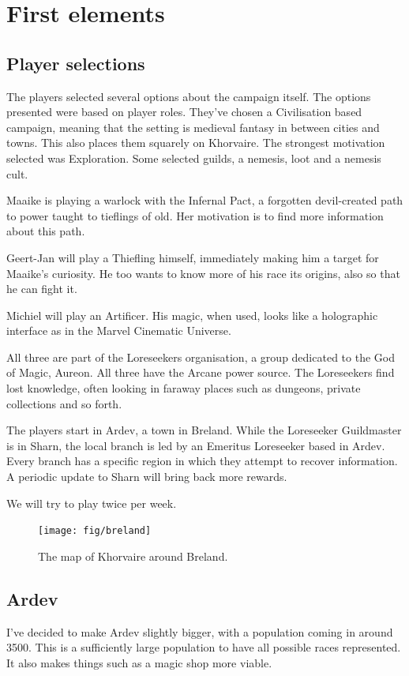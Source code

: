 
\chapter{First elements}
\section{Player selections}
The players selected several options about the campaign itself. The options
presented were based on player roles. They've chosen a Civilisation based campaign, meaning that the setting is medieval fantasy in between cities and towns. This also places them squarely on Khorvaire. The strongest motivation selected was Exploration. Some selected guilds, a nemesis, loot and a nemesis cult. 

Maaike is playing a warlock with the Infernal Pact, a forgotten devil-created path to power taught to tieflings of old. Her motivation is to find more information about this
path.

Geert-Jan will play a Thiefling himself, immediately making him a target for Maaike's curiosity. He too wants to know more of his race its origins, also so that he can fight it.

Michiel will play an Artificer. His magic, when used, looks like a holographic interface as in the Marvel Cinematic Universe. 

All three are part of the Loreseekers organisation, a group dedicated to the God of Magic, Aureon. All three have the Arcane power source. The Loreseekers find lost knowledge, often looking in faraway places such as dungeons, private collections and so forth. 

The players start in Ardev, a town in Breland. While the Loreseeker Guildmaster is in Sharn, the local branch is led by an Emeritus Loreseeker based in Ardev. Every branch has a specific region in which they attempt to recover information. A periodic update to Sharn will bring back more rewards.

We will try to play twice per week.

\begin{figure}[b]
    \centering
    \texttt{[image: fig/breland]}
    \caption{\label{fig:breland} The map of Khorvaire around Breland.}
\end{figure}

\section{Ardev}
I've decided to make Ardev slightly bigger, with a population coming in around 3500. This is a sufficiently large population to have all possible races represented. It also makes things such as a magic shop more viable.

